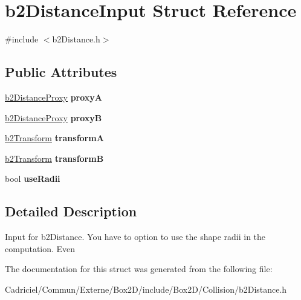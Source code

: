 \hypertarget{structb2_distance_input}{}\section{b2\+Distance\+Input Struct Reference}
\label{structb2_distance_input}


{\ttfamily \#include $<$b2\+Distance.\+h$>$}

\subsection*{Public Attributes}
\begin{DoxyCompactItemize}
\item 
\hyperlink{structb2_distance_proxy}{b2\+Distance\+Proxy} {\bfseries proxyA}\hypertarget{structb2_distance_input_a84d378f4f0e2f06fbe03d413e9dfbbd9}{}\label{structb2_distance_input_a84d378f4f0e2f06fbe03d413e9dfbbd9}

\item 
\hyperlink{structb2_distance_proxy}{b2\+Distance\+Proxy} {\bfseries proxyB}\hypertarget{structb2_distance_input_ad08521a9cdf9d418ececfd44de83a5d3}{}\label{structb2_distance_input_ad08521a9cdf9d418ececfd44de83a5d3}

\item 
\hyperlink{structb2_transform}{b2\+Transform} {\bfseries transformA}\hypertarget{structb2_distance_input_a0889c2f7120ba521d6e40e2a22834ddb}{}\label{structb2_distance_input_a0889c2f7120ba521d6e40e2a22834ddb}

\item 
\hyperlink{structb2_transform}{b2\+Transform} {\bfseries transformB}\hypertarget{structb2_distance_input_a47352d7c5b3db80b2fb8cf338f1c1895}{}\label{structb2_distance_input_a47352d7c5b3db80b2fb8cf338f1c1895}

\item 
bool {\bfseries use\+Radii}\hypertarget{structb2_distance_input_ab72a770be4a91997d00112409de5fea7}{}\label{structb2_distance_input_ab72a770be4a91997d00112409de5fea7}

\end{DoxyCompactItemize}


\subsection{Detailed Description}
Input for b2\+Distance. You have to option to use the shape radii in the computation. Even 

The documentation for this struct was generated from the following file\+:\begin{DoxyCompactItemize}
\item 
Cadriciel/\+Commun/\+Externe/\+Box2\+D/include/\+Box2\+D/\+Collision/b2\+Distance.\+h\end{DoxyCompactItemize}
